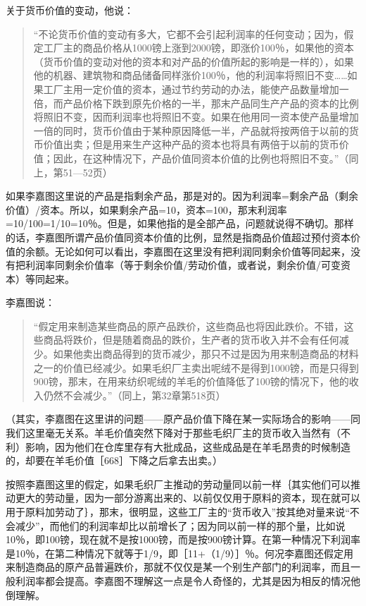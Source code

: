 关于货币价值的变动，他说：

\begin{quote}{“不论货币价值的变动有多大，它都不会引起利润率的任何变动；因为，假定工厂主的商品价格从1000镑上涨到2000镑，即涨价100％，如果他的资本（货币价值的变动对他的资本和对产品的价值所起的影响是一样的），如果他的机器、建筑物和商品储备同样涨价100％，他的利润率将照旧不变……如果工厂主用一定价值的资本，通过节约劳动的办法，能使产品数量增加一倍，而产品价格下跌到原先价格的一半，那末产品同生产产品的资本的比例将照旧不变，因而利润率也将照旧不变。如果在他用同一资本使产品量增加一倍的同时，货币价值由于某种原因降低一半，产品就将按两倍于以前的货币价值出卖；但是用来生产这种产品的资本也将具有两倍于以前的货币价值；因此，在这种情况下，产品价值同资本价值的比例也将照旧不变。”（同上，第51—52页）}\end{quote}

如果李嘉图这里说的产品是指剩余产品，那是对的。因为利润率=剩余产品（剩余价值）/资本。所以，如果剩余产品=10，资本=100，那末利润率=10/100=1/10=10％。但是，如果他指的是全部产品，问题就说得不确切。那样的话，李嘉图所谓产品价值同资本价值的比例，显然是指商品价值超过预付资本价值的余额。无论如何可以看出，李嘉图在这里没有把利润同剩余价值等同起来，没有把利润率同剩余价值率（等于剩余价值/劳动价值，或者说，剩余价值/可变资本）等同起来。

李嘉图说：

\begin{quote}{“假定用来制造某些商品的原产品跌价，这些商品也将因此跌价。不错，这些商品将跌价，但是随着商品的跌价，生产者的货币收入并不会有任何减少。如果他卖出商品得到的货币减少，那只不过是因为用来制造商品的材料之一的价值已经减少。如果毛织厂主卖出呢绒不是得到1000镑，而是只得到900镑，那末，在用来纺织呢绒的羊毛的价值降低了100镑的情况下，他的收入仍然不会减少。”（同上，第32章第518页）}\end{quote}

（其实，李嘉图在这里讲的问题——原产品价值下降在某一实际场合的影响——同我们这里毫无关系。羊毛价值突然下降对于那些毛织厂主的货币收入当然有（不利）影响，因为他们在仓库里存有大批成品，这些成品是在羊毛昂贵的时候制造的，却要在羊毛价值［668］下降之后拿去出卖。）

按照李嘉图这里的假定，如果毛织厂主推动的劳动量同以前一样｛其实他们可以推动更大的劳动量，因为一部分游离出来的、以前仅仅用于原料的资本，现在就可以用于原料加劳动了｝，那末，很明显，这些工厂主的“货币收入”按其绝对量来说“不会减少”，而他们的利润率却比以前增长了；因为同以前一样的那个量，比如说10％，即100镑，现在就不是按1000镑，而是按900镑计算。在第一种情况下利润率是10％，在第二种情况下就等于1/9，即［11+（1/9）］％。何况李嘉图还假定用来制造商品的原产品普遍跌价，那就不仅仅是某一个别生产部门的利润率，而且一般利润率都会提高。李嘉图不理解这一点是令人奇怪的，尤其是因为相反的情况他倒理解。

